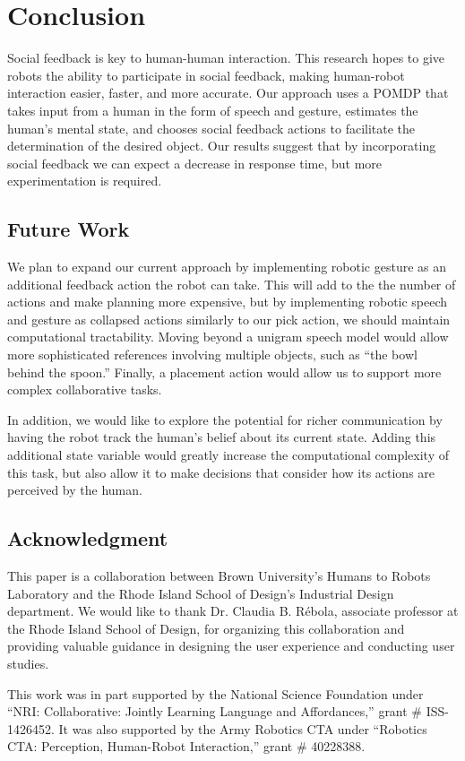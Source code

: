 \documentclass[letterpaper]{article}
\begin{document}
\section{Conclusion}

Social feedback is key to human-human interaction. This research
hopes to give robots the ability to participate in social feedback, making
human-robot interaction easier, faster, and more accurate. Our approach uses a
POMDP that takes input from a human in the form of speech and
gesture, estimates the human's mental state, and chooses
social feedback actions to facilitate the determination of the desired object.  
Our results suggest that by incorporating social feedback we can expect a decrease
in response time, but more experimentation is required.

\subsection{Future Work}

We plan to expand our current approach by implementing robotic gesture as an
additional feedback action the robot can take. This will add to the the number
of actions and make planning more expensive, but by implementing robotic speech
and gesture as collapsed actions similarly to our pick action, we should
maintain computational tractability. Moving beyond a unigram speech model would
allow more sophisticated references involving multiple objects, such as ``the
bowl behind the spoon.''  Finally, a placement action would allow us to
support more complex collaborative tasks.

In addition, we would like to explore the potential for richer communication
by having the robot track the human's belief about its current state. Adding this 
additional state variable would greatly increase the computational complexity of 
this task, but also allow it to make decisions that consider how its actions are 
perceived by the human. 


\subsection{Acknowledgment}

This paper is a collaboration between Brown University's Humans to Robots Laboratory and the Rhode Island School of Design's Industrial Design department. We would like to thank Dr. Claudia B. R\'{e}bola, associate professor at the Rhode Island School of Design, for organizing this collaboration and providing valuable guidance in designing the user experience and conducting user studies. 


This work was in part supported by the National Science Foundation under
``NRI: Collaborative: Jointly Learning Language and Affordances,'' grant \#
ISS-1426452.  It was also supported by the Army Robotics CTA under
``Robotics CTA: Perception, Human-Robot Interaction,'' grant \# 40228388.




%
\end{document}
